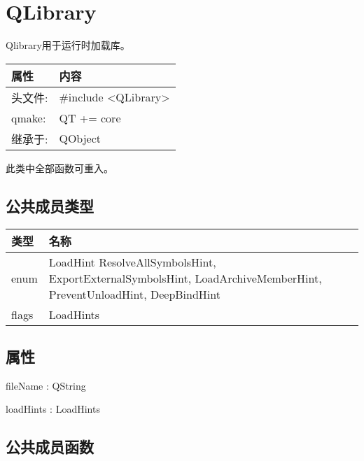 \chapter{QLibrary}

Qlibrary用于运行时加载库。

\begin{tabular}{|l|l|}
\hline
属性 &	内容\\
\hline
头文件:& 	\#include <QLibrary>\\
\hline
qmake:& 	QT += core\\
\hline
继承于:& 	QObject\\
\hline
\end{tabular}

\begin{notice}
此类中全部函数可重入。
\end{notice}

\section{公共成员类型}

\begin{tabular}{|l|m{23em}|}
\hline
类型 &	名称\\
\hline
enum &	LoadHint { ResolveAllSymbolsHint, ExportExternalSymbolsHint,
       LoadArchiveMemberHint, PreventUnloadHint, DeepBindHint }\\
\hline
flags &	LoadHints \\ 
\hline
\end{tabular}

\section{属性}

\begin{compactitem}
\item fileName : QString
\item loadHints : LoadHints
\end{compactitem}

\section{公共成员函数}

